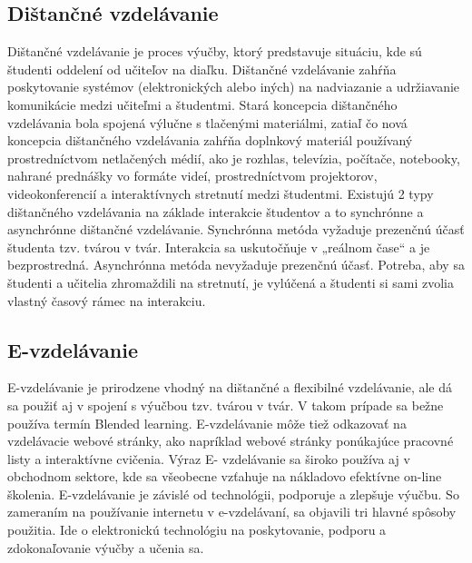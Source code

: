 \documentclass[10pt,oneside,slovak,a4paper]{article}
\begin{document}
\subsection{Dištančné vzdelávanie}
Dištančné vzdelávanie je proces výučby, ktorý predstavuje situáciu, kde sú študenti oddelení od učiteľov na diaľku\cite{India}. Dištančné vzdelávanie zahŕňa poskytovanie systémov (elektronických alebo iných) na nadviazanie a udržiavanie komunikácie medzi učiteľmi a študentmi.
Stará koncepcia dištančného vzdelávania bola spojená výlučne s tlačenými materiálmi, zatiaľ čo nová koncepcia dištančného vzdelávania zahŕňa doplnkový materiál používaný prostredníctvom netlačených médií, ako je rozhlas, televízia, počítače, notebooky, nahrané prednášky vo formáte videí, prostredníctvom projektorov, videokonferencií a interaktívnych stretnutí medzi študentmi.
Existujú 2 typy dištančného vzdelávania na základe interakcie študentov a to synchrónne a asynchrónne dištančné vzdelávanie. Synchrónna metóda vyžaduje prezenčnú účasť študenta tzv. tvárou v tvár. Interakcia sa uskutočňuje v „reálnom čase“ a je bezprostredná. Asynchrónna metóda nevyžaduje prezenčnú účasť. Potreba, aby sa študenti a učitelia zhromaždili na stretnutí, je vylúčená a študenti si sami zvolia vlastný časový rámec na interakciu.
\subsection{E-vzdelávanie}
E-vzdelávanie je prirodzene vhodný na dištančné a flexibilné vzdelávanie, ale dá sa použiť aj v spojení s výučbou tzv. tvárou v tvár\cite{elearningDef}. V takom prípade sa bežne používa termín Blended learning. E-vzdelávanie môže tiež odkazovať na vzdelávacie webové stránky, ako napríklad webové stránky ponúkajúce pracovné listy a interaktívne cvičenia. Výraz E- vzdelávanie sa široko používa aj v obchodnom sektore, kde sa všeobecne vzťahuje na nákladovo efektívne on-line školenia. E-vzdelávanie je závislé od technológii, podporuje a zlepšuje výučbu. So zameraním na používanie internetu v e-vzdelávaní, sa objavili tri hlavné spôsoby použitia. Ide o elektronickú technológiu na poskytovanie, podporu a zdokonaľovanie výučby a učenia sa. 
\end{document}

